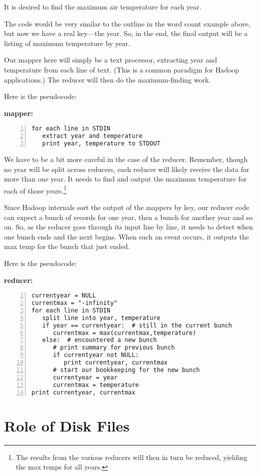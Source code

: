 It is desired to find the maximum air temperature for each year.

The code would be very similar to the outline in the word count example
above, but now we have a real key---the year.  So, in the end, the final
output will be a listing of maximum temperature by year.

Our mapper here will simply be a text processor, extracting year and
temperature from each line of text.  (This is a common paradigm for
Hadoop applications.) The reducer will then do the maximum-finding work.  

Here is the pseudocode:

{\bf mapper:}

\begin{lstlisting}[numbers=left]
for each line in STDIN
   extract year and temperature
   print year, temperature to STDOUT  
\end{lstlisting}

We have to be a bit more careful in the case of the reducer.  Remember,
though no year will be split across reducers, each reducer will likely
receive the data for more than one year.  It needs to find and output
the maximum temperature for each of those years.\footnote{The results
from the various reducers will then in turn be reduced, yielding the max
temps for all years.}

Since Hadoop internals sort the output of the mappers by key, our
reducer code can expect a bunch of records for one year, then a bunch
for another year and so on.  So, as the reducer goes through its input
line by line, it needs to detect when one bunch ends and the next
begins.  When such an event occurs, it outputs the max temp for the
bunch that just ended.  

Here is the pseudocode:

{\bf reducer:}

\begin{lstlisting}[numbers=left]
currentyear = NULL
currentmax = "-infinity"
for each line in STDIN
   split line into year, temperature
   if year == currentyear:  # still in the current bunch
      currentmax = max(currentmax,temperature)
   else:  # encountered a new bunch
      # print summary for previous bunch
      if currentyear not NULL:  
         print currentyear, currentmax
      # start our bookkeeping for the new bunch
      currentyear = year
      currentmax = temperature
print currentyear, currentmax
\end{lstlisting}

\section{Role of Disk Files}


